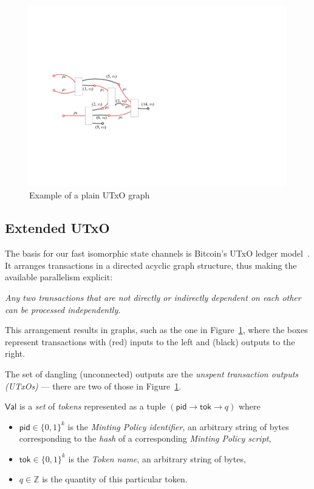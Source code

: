 \begin{figure}[t]
  \centering
 \includegraphics[width=\textwidth/2]{figures/utxo-graph.pdf}
 \caption{Example of a plain UTxO graph}
  \label{fig:utxo-graph}
\end{figure}

\subsection{Extended UTxO}
The basis for our fast isomorphic state channels is Bitcoin's UTxO ledger model~\cite{formal-model-of-bitcoin-transactions,Zahnentferner18-UTxO}. It arranges transactions in a directed acyclic graph structure, thus making the available parallelism explicit: 

\emph{Any two transactions that are not directly or indirectly dependent on each other can be processed independently.}

This arrangement results in graphs, such as the one in Figure~\ref{fig:utxo-graph},
where the boxes represent transactions with (red) inputs to the left and (black) outputs to the
right.

The set of dangling (unconnected) outputs are the \emph{unspent transaction outputs (UTxOs)} --- there are two of those in Figure~\ref{fig:utxo-graph}. 


\begin{definition}[Values]

$\mathsf{Val}$ is a \emph{set} of \emph{tokens} represented as a tuple $(\mathsf{pid} \rightarrow \mathsf{tok} \rightarrow q)$ where
\begin{itemize}
    \item $\mathsf{pid} \in \{0,1\}^k$ is the \emph{Minting Policy identifier}, an arbitrary string of bytes corresponding to the \emph{hash} of a corresponding \emph{Minting Policy script},
    \item $\mathsf{tok} \in \{0,1\}^k$ is the \emph{Token name}, an arbitrary string of bytes,
    \item $q \in \mathbb{Z}$ is the quantity of this particular token.
\end{itemize}

\end{definition}

